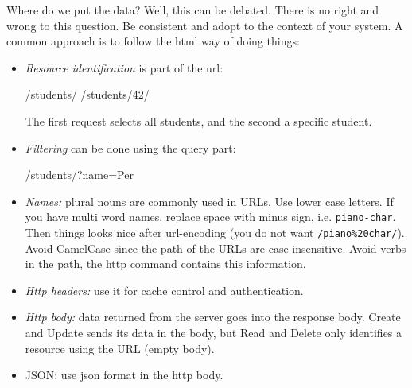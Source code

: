 Where do we put the data? Well, this can be debated. There is no right and wrong to this question. Be consistent and adopt to the context of your system. A common approach is to follow the html way of doing things:
\begin{itemize}
  \item \emph{Resource identification} is part of the url:
  \begin{Code}
  /students/
  /students/42/
  \end{Code}
  The first request selects all students, and the second a specific student.
  \item \emph{Filtering} can be done using the query part:
  \begin{Code}
  /students/?name=Per
  \end{Code}
  \item \emph{Names:}  plural nouns are commonly used in URLs. Use lower case letters. If you have multi word names, replace space with minus sign, i.e. \texttt{piano-char}. Then things looks nice after url-encoding (you do not want \texttt{/piano\%20char/}). Avoid CamelCase since the path of the URLs are case insensitive. Avoid verbs in the path, the http command contains this information.
  \item \emph{Http headers:} use it for cache control and authentication.
  \item \emph{Http body:} data returned from the server goes into the response body. Create and Update sends its data in the body, but Read and Delete only identifies a resource using the URL (empty body).
  \item{JSON:} use json format in the http body.
\end{itemize}






